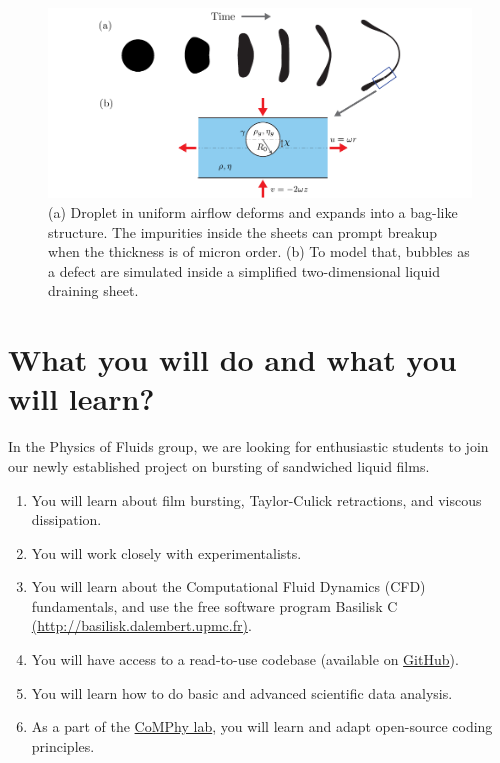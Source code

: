 \documentclass[11pt]{article}
\begin{document}
\begin{figure}[h]
\centering
\includegraphics[width=\textwidth]{schematic_02.pdf}
\caption{(a) Droplet in uniform airflow deforms and expands into a bag-like structure. The impurities inside the sheets can prompt breakup when the thickness is of micron order. (b) To model that, bubbles as a defect are simulated inside a simplified two-dimensional liquid draining sheet.}
\label{fig:droplets2021}
\end{figure}

\section*{What you will do and what you will learn?}
In the Physics of Fluids group, we are looking for enthusiastic students to join our newly established project on bursting of sandwiched liquid films.

\begin{enumerate}
\item You will learn about film bursting, Taylor-Culick retractions, and viscous dissipation. 
\item You will work closely with experimentalists. 
\item You will learn about the Computational Fluid Dynamics (CFD) fundamentals, and use the free software program Basilisk C \href{http://basilisk.dalembert.upmc.fr}{(http://basilisk.dalembert.upmc.fr)}.
\item You will have access to a read-to-use codebase (available on \href{https://github.com/comphy-lab/bubbleinSheet}{GitHub}).
\item You will learn how to do basic and advanced scientific data analysis.
\item As a part of the \href{https://comphy-lab.org}{CoMPhy lab}, you will learn and adapt open-source coding principles. 
\end{enumerate}
\end{document}
